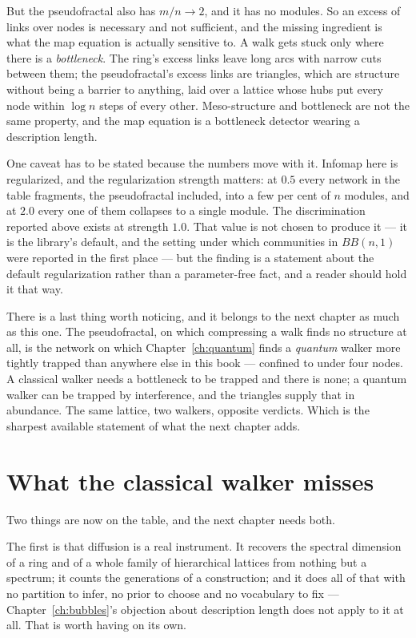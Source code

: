 But the pseudofractal also has $m/n \to 2$, and it has no modules. So an excess of links
over nodes is necessary and not sufficient, and the missing ingredient is what the map
equation is actually sensitive to. A walk gets stuck only where there is a
\emph{bottleneck}. The ring's excess links leave long arcs with narrow cuts between
them; the pseudofractal's excess links are triangles, which are structure without being
a barrier to anything, laid over a lattice whose hubs put every node within
$\log n$ steps of every other. Meso-structure and bottleneck are not the same property,
and the map equation is a bottleneck detector wearing a description length.

One caveat has to be stated because the numbers move with it. Infomap here is
regularized, and the regularization strength matters: at $0.5$ every network in the
table fragments, the pseudofractal included, into a few per cent of $n$ modules, and at
$2.0$ every one of them collapses to a single module. The discrimination reported above
exists at strength $1.0$. That value is not chosen to produce it --- it is the library's
default, and the setting under which communities in $BB(n,1)$ were reported in the first
place \citep{vazquezcommunities2025} --- but the finding is a statement about the default
regularization rather than a parameter-free fact, and a reader should hold it that way.

There is a last thing worth noticing, and it belongs to the next chapter as much as
this one. The pseudofractal, on which compressing a walk finds no structure at all, is
the network on which Chapter~\ref{ch:quantum} finds a \emph{quantum} walker more tightly
trapped than anywhere else in this book --- confined to under four nodes. A classical
walker needs a bottleneck to be trapped and there is none; a quantum walker can be
trapped by interference, and the triangles supply that in abundance. The same lattice,
two walkers, opposite verdicts. Which is the sharpest available statement of what the
next chapter adds.

\section{What the classical walker misses}

Two things are now on the table, and the next chapter needs both.

The first is that diffusion is a real instrument. It recovers the spectral dimension
of a ring and of a whole family of hierarchical lattices from nothing but a
spectrum; it counts the generations of a construction; and it does all of that with
no partition to infer, no prior to choose and no vocabulary to fix ---
Chapter~\ref{ch:bubbles}'s objection about description length does not apply to it
at all. That is worth having on its own.

